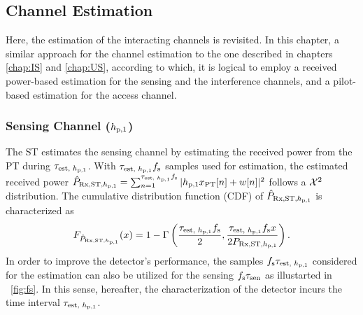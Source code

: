 \subsection{Channel Estimation}
Here, the estimation of the interacting channels is revisited. In this chapter, a similar approach for the channel estimation to the one described in chapters \ref{chap:IS} and \ref{chap:US}, according to which, it is logical to employ a received power-based estimation for the sensing and the interference channels, and a pilot-based estimation for the access channel.  
\subsubsection*{Sensing Channel ($h_{\text{p,1}}$)}
The ST estimates the sensing channel by estimating the received power from the PT during $\tau_{\text{est, $h_{\text{p,1}}$}}$. With $\tau_{\text{est, $h_{\text{p,1}}$}} f_{\text{s}}$ samples used for estimation, the estimated received power $\hat{P}_{\text{Rx,ST,$h_{\text{p,1}}$}} = \sum_{n = 1}^{\tau_{\text{est, $h_{\text{p,1}}$}} f_{\text{s}}} |h_{\text{p,1}} x_{\text{PT}}[n] + w[n]|^2$ follows a $\cchi2$ distribution.
The cumulative distribution function (CDF) of $\hat{P}_{\text{Rx,ST,$h_{\text{p,1}}$}}$ is characterized as
\begin{align}
F_{\hat{P}_{\text{Rx,ST,$h_{\text{p,1}}$}}}(x) = 1 - \Gamma \left( \frac{\tau_{\text{est, $h_{\text{p,1}}$}} f_{\text{s}}}{2}, \frac{\tau_{\text{est, $h_{\text{p,1}}$}} f_{\text{s}} x}{2 P_{\text{Rx,ST,$h_{\text{p,1}}$}}} \right) \label{eq:fprcvdstpt}.
\end{align}
In order to improve the detector's performance, the samples $f_{\text{s}} \tau_{\text{est, $h_{\text{p,1}}$}}$ considered for the estimation can also be utilized for the sensing $f_{\text{s}} \tau_{\text{sen}}$ as illustarted in \figurename~\ref{fig:fs}. In this sense, hereafter, the characterization of the detector incurs the time interval $\tau_{\text{est, $h_{\text{p,1}}$}}$. 
  
